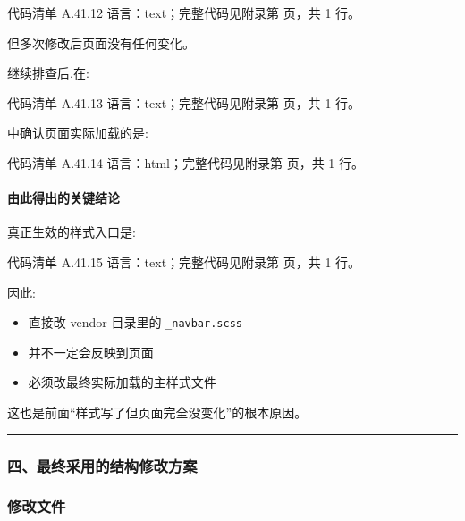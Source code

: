 \documentclass[lang=cn,scheme=chinese,color=blue,device=normal,toc=onecol,math=cm]{elegantbook}
\begin{document}
\begin{codeindexbox}{代码清单 A.41.12}
语言：text；完整代码见附录第 \pageref{code:41:12} 页，共 1 行。
\end{codeindexbox}


但多次修改后页面没有任何变化。\par


继续排查后,在:\par


\begin{codeindexbox}{代码清单 A.41.13}
语言：text；完整代码见附录第 \pageref{code:41:13} 页，共 1 行。
\end{codeindexbox}


中确认页面实际加载的是:\par


\begin{codeindexbox}{代码清单 A.41.14}
语言：html；完整代码见附录第 \pageref{code:41:14} 页，共 1 行。
\end{codeindexbox}


\paragraph{由此得出的关键结论}


真正生效的样式入口是:\par


\begin{codeindexbox}{代码清单 A.41.15}
语言：text；完整代码见附录第 \pageref{code:41:15} 页，共 1 行。
\end{codeindexbox}


因此:\par


\begin{itemize}
\item 直接改 vendor 目录里的 \texttt{\_\allowbreak{}navbar.scss}
\item 并不一定会反映到页面
\item 必须改最终实际加载的主样式文件
\end{itemize}


这也是前面“样式写了但页面完全没变化”的根本原因。\par


\medskip\hrule\medskip


\subsubsection{四、最终采用的结构修改方案}


\subsubsection{修改文件}
\end{document}
